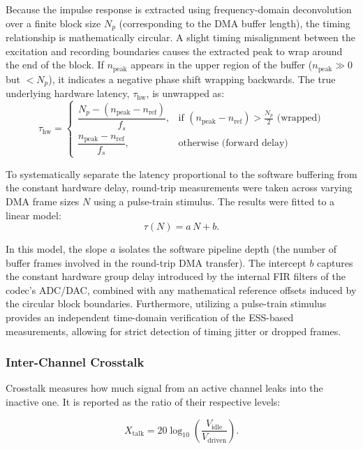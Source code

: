 Because the impulse response is extracted using frequency-domain deconvolution over a finite block size $N_p$ (corresponding to the DMA buffer length), the timing relationship is mathematically circular. A slight timing misalignment between the excitation and recording boundaries causes the extracted peak to wrap around the end of the block. If $n_{\text{peak}}$ appears in the upper region of the buffer ($n_{\text{peak}} \gg 0$ but $< N_p$), it indicates a negative phase shift wrapping backwards. The true underlying hardware latency, $\tau_{\text{hw}}$, is unwrapped as:
\begin{equation}
\tau_{\text{hw}} =
\begin{cases}
\dfrac{N_p - (n_{\text{peak}} - n_{\text{ref}})}{f_s}, & \text{if } (n_{\text{peak}} - n_{\text{ref}}) > \frac{N_p}{2} \text{ (wrapped)} \\[2ex]
\dfrac{n_{\text{peak}} - n_{\text{ref}}}{f_s}, & \text{otherwise (forward delay)}
\end{cases}
\label{eq:latency_unwrap}
\end{equation}

To systematically separate the latency proportional to the software buffering from the constant hardware delay, round-trip measurements were taken across varying DMA frame sizes $N$ using a pulse-train stimulus. The results were fitted to a linear model:
\begin{equation}
\tau(N) = a\,N + b.
\label{eq:frame_model}
\end{equation}

In this model, the slope $a$ isolates the software pipeline depth (the number of buffer frames involved in the round-trip DMA transfer). The intercept $b$ captures the constant hardware group delay introduced by the internal FIR filters of the codec's ADC/DAC, combined with any mathematical reference offsets induced by the circular block boundaries. Furthermore, utilizing a pulse-train stimulus provides an independent time-domain verification of the ESS-based measurements, allowing for strict detection of timing jitter or dropped frames.
\subsubsection{Inter-Channel Crosstalk}
\label{sec:char_crosstalk}
Crosstalk measures how much signal from an active channel leaks into the inactive one. It is reported as the ratio of their respective levels:

\begin{equation}
X_{\text{talk}} = 20\log_{10}\!\left( \frac{V_{\text{idle}}}{V_{\text{driven}}} \right).
\label{eq:crosstalk}
\end{equation}

